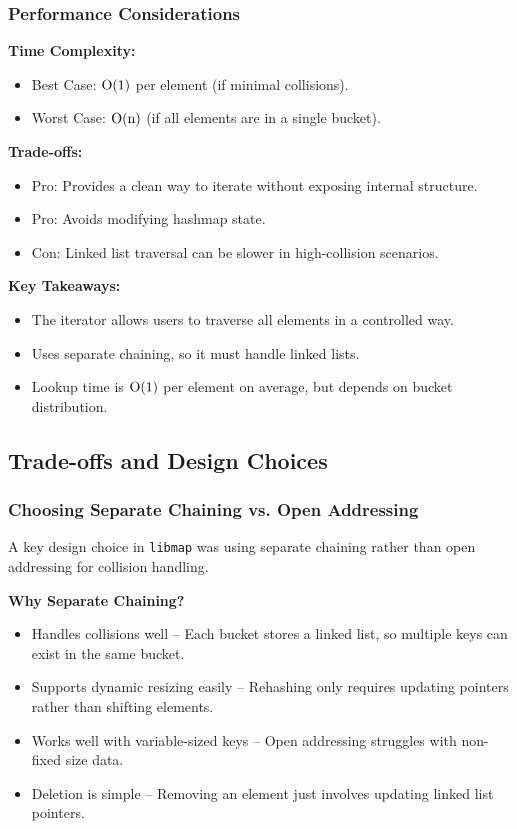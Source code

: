 \documentclass[titlepage]{article}
\begin{document}
\subsubsection{Performance Considerations}
\textbf{Time Complexity:}
\begin{itemize}
    \item Best Case: \( $O(1)$ \) per element (if minimal collisions).
    \item Worst Case: \( $O(n)$ \) (if all elements are in a single bucket).
\end{itemize}

\textbf{Trade-offs:}
\begin{itemize}
    \item Pro: Provides a clean way to iterate without exposing internal structure.
    \item Pro: Avoids modifying hashmap state.
    \item Con: Linked list traversal can be slower in high-collision scenarios.
\end{itemize}

\textbf{Key Takeaways:}
\begin{itemize}
    \item The iterator allows users to traverse all elements in a controlled way.
    \item Uses separate chaining, so it must handle linked lists.
    \item Lookup time is \( $O(1)$ \) per element on average, but depends on bucket distribution.
\end{itemize}

\subsection{Trade-offs and Design Choices}

\subsubsection{Choosing Separate Chaining vs. Open Addressing}
A key design choice in \texttt{libmap} was using separate chaining rather than open addressing for collision handling.

\textbf{Why Separate Chaining?}
\begin{itemize}
    \item Handles collisions well -- Each bucket stores a linked list, so multiple keys can exist in the same bucket.
    \item Supports dynamic resizing easily -- Rehashing only requires updating pointers rather than shifting elements.
    \item Works well with variable-sized keys -- Open addressing struggles with non-fixed size data.
    \item Deletion is simple -- Removing an element just involves updating linked list pointers.
\end{itemize}
\end{document}
